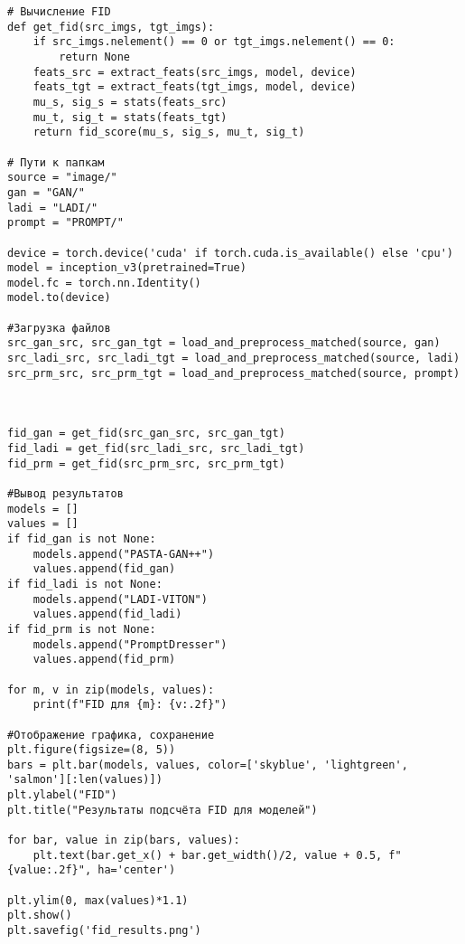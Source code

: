 \begin{verbatim}
# Вычисление FID
def get_fid(src_imgs, tgt_imgs):
    if src_imgs.nelement() == 0 or tgt_imgs.nelement() == 0:
        return None
    feats_src = extract_feats(src_imgs, model, device)
    feats_tgt = extract_feats(tgt_imgs, model, device)
    mu_s, sig_s = stats(feats_src)
    mu_t, sig_t = stats(feats_tgt)
    return fid_score(mu_s, sig_s, mu_t, sig_t)

# Пути к папкам
source = "image/"
gan = "GAN/"
ladi = "LADI/"
prompt = "PROMPT/"

device = torch.device('cuda' if torch.cuda.is_available() else 'cpu')
model = inception_v3(pretrained=True)
model.fc = torch.nn.Identity()
model.to(device)

#Загрузка файлов
src_gan_src, src_gan_tgt = load_and_preprocess_matched(source, gan)
src_ladi_src, src_ladi_tgt = load_and_preprocess_matched(source, ladi)
src_prm_src, src_prm_tgt = load_and_preprocess_matched(source, prompt)



fid_gan = get_fid(src_gan_src, src_gan_tgt)
fid_ladi = get_fid(src_ladi_src, src_ladi_tgt)
fid_prm = get_fid(src_prm_src, src_prm_tgt)

#Вывод результатов
models = []
values = []
if fid_gan is not None:
    models.append("PASTA-GAN++")
    values.append(fid_gan)
if fid_ladi is not None:
    models.append("LADI-VITON")
    values.append(fid_ladi)
if fid_prm is not None:
    models.append("PromptDresser")
    values.append(fid_prm)

for m, v in zip(models, values):
    print(f"FID для {m}: {v:.2f}")

#Отображение графика, сохранение
plt.figure(figsize=(8, 5))
bars = plt.bar(models, values, color=['skyblue', 'lightgreen', 'salmon'][:len(values)])
plt.ylabel("FID")
plt.title("Результаты подсчёта FID для моделей")

for bar, value in zip(bars, values):
    plt.text(bar.get_x() + bar.get_width()/2, value + 0.5, f"{value:.2f}", ha='center')

plt.ylim(0, max(values)*1.1)
plt.show()
plt.savefig('fid_results.png')
\end{verbatim}